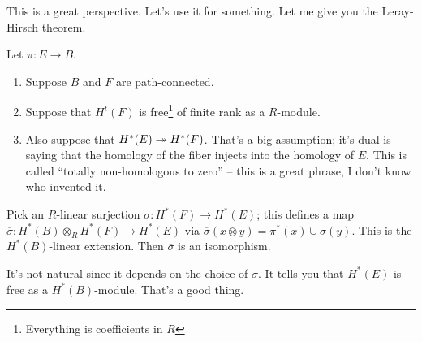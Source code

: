 This is a great perspective.
Let's use it for something.
Let me give you the Leray-Hirsch theorem.
\begin{theorem}\label{leray-hirsch}
    Let $\pi:E\to B$.
    \begin{enumerate}
	\item Suppose $B$ and $F$ are path-connected.
	\item Suppose that $H^t(F)$ is free\footnote{Everything is coefficients in $R$} of finite rank as a $R$-module.
	\item Also suppose that $H^\ast(E)\twoheadrightarrow H^\ast(F)$.
    That's a big assumption; it's dual is saying that the homology of the fiber injects into the homology of $E$.
    This is called ``totally non-homologous to zero'' -- this is a great phrase, I don't know who invented it.
    \end{enumerate}
    Pick an $R$-linear surjection $\sigma:H^\ast(F)\to H^\ast(E)$; this defines a map $\overline{\sigma}:H^\ast(B)\otimes_R H^\ast(F)\to H^\ast(E)$ via $\overline{\sigma}(x\otimes y) = \pi^\ast(x)\cup \sigma(y)$.
    This is the $H^\ast(B)$-linear extension.
    Then $\overline{\sigma}$ is an isomorphism.
\end{theorem}
\begin{remark}
    It's not natural since it depends on the choice of $\sigma$.
    It tells you that $H^\ast(E)$ is free as a $H^\ast(B)$-module.
    That's a good thing.
\end{remark}

